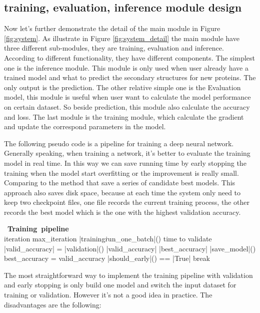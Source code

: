 \subsection{training, evaluation, inference module design}
Now let's further demonstrate the detail of the main module in Figure \ref{fig:system}. As illustrate in Figure \ref{fig:system_detail} the main module have three different sub-modules, they are training, evaluation and inference. According to different functionality, they have different components. The simplest one is the inference module. This module is only used when user already have a trained model and what to predict the secondary structures for new proteins. The only output is the prediction. The other relative simple one is the Evaluation model, this module is useful when user want to calculate the model performance on certain dataset. So beside prediction, this module also calculate the accuracy and loss. The last module is the training module, which calculate the gradient and update the correspond parameters in the model.\par

The following pseudo code is a pipeline for training a deep neural network. Generally speaking, when training a network,  it's better to evaluate the training model in real time. In this way we can save running time by early stopping the training when the model start overfitting or the improvement is really small. Comparing to the method that save a series of candidate best models. This approach also saves disk space, because at each time the system only need to keep two checkpoint files, one file records the current training process, the other records the best model which is the one with the highest validation accuracy.\par


\begin{program}
\mbox{\textbf{ Training pipeline} }
\BEGIN \\ 
\WHILE iteration \lt max\_iteration \DO 
    \CALL |training\.run\_one\_batch|()
    \IF time to validate 
        \CALL |valid_accuracy| = |validation|()
        \IF |valid_accuracy| \gt |best_accuracy|
                  \CALL |save\_model|()
                  best_accuracy = valid_accuracy\FI
    \IF \CALL |should_early|() == |True|
        break
    
\end{program}

The most straightforward way to implement the training pipeline with validation and early stopping is only build one model and switch the input dataset for training or validation. However it's not a good idea in practice. The disadvantages are the following:

